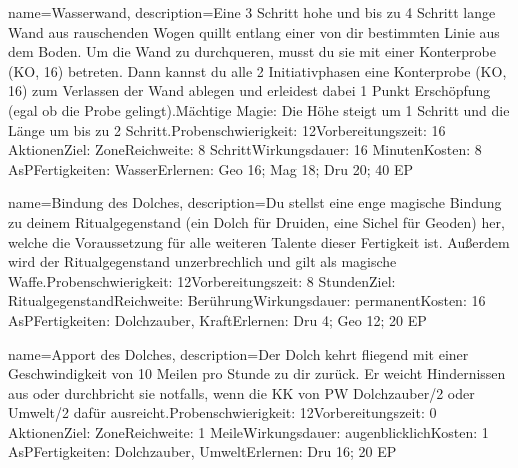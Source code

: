 {
    name={Wasserwand},
    description={Eine 3 Schritt hohe und bis zu 4 Schritt lange Wand aus rauschenden Wogen quillt entlang einer von dir bestimmten Linie aus dem Boden. Um die Wand zu durchqueren, musst du sie mit einer Konterprobe (KO, 16) betreten. Dann kannst du alle 2 Initiativphasen eine Konterprobe (KO, 16) zum Verlassen der Wand ablegen und erleidest dabei 1 Punkt Erschöpfung (egal ob die Probe gelingt).\newline Mächtige Magie: Die Höhe steigt um 1 Schritt und die Länge um bis zu 2 Schritt.\newline Probenschwierigkeit: 12\newline Vorbereitungszeit: 16 Aktionen\newline Ziel: Zone\newline Reichweite: 8 Schritt\newline Wirkungsdauer: 16 Minuten\newline Kosten: 8 AsP\newline Fertigkeiten: Wasser\newline Erlernen: Geo 16; Mag 18; Dru 20; 40 EP}
}


{
    name={Bindung des Dolches},
    description={Du stellst eine enge magische Bindung zu deinem Ritualgegenstand (ein Dolch für Druiden, eine Sichel für Geoden) her, welche die Voraussetzung für alle weiteren Talente dieser Fertigkeit ist. Außerdem wird der Ritualgegenstand unzerbrechlich und gilt als magische Waffe.\newline Probenschwierigkeit: 12\newline Vorbereitungszeit: 8 Stunden\newline Ziel: Ritualgegenstand\newline Reichweite: Berührung\newline Wirkungsdauer: permanent\newline Kosten: 16 AsP\newline Fertigkeiten: Dolchzauber, Kraft\newline Erlernen: Dru 4; Geo 12; 20 EP}
}


{
    name={Apport des Dolches},
    description={Der Dolch kehrt fliegend mit einer Geschwindigkeit von 10 Meilen pro Stunde zu dir zurück. Er weicht Hindernissen aus oder durchbricht sie notfalls, wenn die KK von PW Dolchzauber/2 oder Umwelt/2 dafür ausreicht.\newline Probenschwierigkeit: 12\newline Vorbereitungszeit: 0 Aktionen\newline Ziel: Zone\newline Reichweite: 1 Meile\newline Wirkungsdauer: augenblicklich\newline Kosten: 1 AsP\newline Fertigkeiten: Dolchzauber, Umwelt\newline Erlernen: Dru 16; 20 EP}
}



